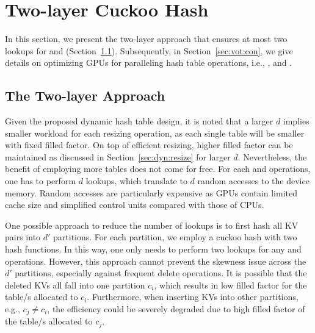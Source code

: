 


\section{Two-layer Cuckoo Hash}\label{sec:vot}
In this section, we present the two-layer approach that ensures at most two lookups for  and  (Section~\ref{sec:vot:two}). 
Subsequently, in Section~\ref{sec:vot:con}, we give details on optimizing GPUs for paralleling hash table operations, i.e., ,  and .



\subsection{The Two-layer Approach}\label{sec:vot:two}
Given the proposed dynamic hash table design, it is noted that a larger $d$ implies smaller workload for each resizing operation, as each single table will be smaller with fixed filled factor. On top of efficient resizing, higher filled factor can be maintained as discussed in Section~\ref{sec:dyn:resize} for larger $d$. Nevertheless, the benefit of employing more tables does not come for free. For each  and  operations, one has to perform $d$ lookups, which translate to $d$ random accesses to the device memory. 
Random accesses are particularly expensive as GPUs contain limited cache size and simplified control units compared with those of CPUs.

One possible approach to reduce the number of lookups is to first hash all KV pairs into $d'$ partitions. For each partition, we employ a cuckoo hash with two hash functions. In this way, one only needs to perform two lookups for any  and  operations. However, this approach cannot prevent the skewness issue across the $d'$ partitions, especially against frequent delete operations. It is possible that the deleted KVs all fall into one partition $c_i$, which results in low filled factor for the table/s allocated to $c_i$. Furthermore, when inserting KVs into other partitions, e.g., $c_j \neq c_i$, the efficiency could be severely degraded due to high filled factor of the table/s allocated to $c_j$. 

